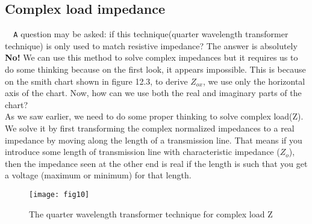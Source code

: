  	\subsection{Complex load impedance}
 	\verb| 	A| question may be asked: if this technique(quarter wavelength transformer technique) is only used to match resistive impedance? The answer is absolutely \textbf{No!}  We can use this method to solve complex impedances but it requires us to do some thinking because on the first look, it appears impossible. This is because on the smith chart shown in figure 12.3, to derive $Z_{ox}$, we use only the horizontal axis of the chart. Now, how can we use both the real and imaginary parts of the chart?\\
 	
 	 As we saw earlier, we need to do some proper thinking to solve complex load(Z). We solve it  by first transforming the complex  normalized impedances to a real impedance by moving along the length of a transmission line. That means if you introduce some length of transmission line with characteristic impedance ($ Z_o$), then the impedance seen at the other end is real if the length is such that you get a voltage (maximum or minimum) for that length.\\%
 	 \begin{figure}[h]
 		\centering
 		\texttt{[image: fig10]}
 		\caption{The quarter wavelength transformer technique for complex load Z}
 	\end{figure}
 	 
